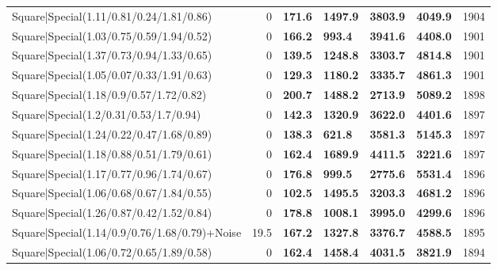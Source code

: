 \begin{tabular}{lrllllr}
 Square|Special(1.11/0.81/0.24/1.81/0.86)                      &             0   & \textbf{171.6} & \textbf{1497.9} & \textbf{3803.9} & \textbf{4049.9} &         1904 \\
 Square|Special(1.03/0.75/0.59/1.94/0.52)                      &             0   & \textbf{166.2} & \textbf{993.4}  & \textbf{3941.6} & \textbf{4408.0} &         1901 \\
 Square|Special(1.37/0.73/0.94/1.33/0.65)                      &             0   & \textbf{139.5} & \textbf{1248.8} & \textbf{3303.7} & \textbf{4814.8} &         1901 \\
 Square|Special(1.05/0.07/0.33/1.91/0.63)                      &             0   & \textbf{129.3} & \textbf{1180.2} & \textbf{3335.7} & \textbf{4861.3} &         1901 \\
 Square|Special(1.18/0.9/0.57/1.72/0.82)                       &             0   & \textbf{200.7} & \textbf{1488.2} & \textbf{2713.9} & \textbf{5089.2} &         1898 \\
 Square|Special(1.2/0.31/0.53/1.7/0.94)                        &             0   & \textbf{142.3} & \textbf{1320.9} & \textbf{3622.0} & \textbf{4401.6} &         1897 \\
 Square|Special(1.24/0.22/0.47/1.68/0.89)                      &             0   & \textbf{138.3} & \textbf{621.8}  & \textbf{3581.3} & \textbf{5145.3} &         1897 \\
 Square|Special(1.18/0.88/0.51/1.79/0.61)                      &             0   & \textbf{162.4} & \textbf{1689.9} & \textbf{4411.5} & \textbf{3221.6} &         1897 \\
 Square|Special(1.17/0.77/0.96/1.74/0.67)                      &             0   & \textbf{176.8} & \textbf{999.5}  & \textbf{2775.6} & \textbf{5531.4} &         1896 \\
 Square|Special(1.06/0.68/0.67/1.84/0.55)                      &             0   & \textbf{102.5} & \textbf{1495.5} & \textbf{3203.3} & \textbf{4681.2} &         1896 \\
 Square|Special(1.26/0.87/0.42/1.52/0.84)                      &             0   & \textbf{178.8} & \textbf{1008.1} & \textbf{3995.0} & \textbf{4299.6} &         1896 \\
 Square|Special(1.14/0.9/0.76/1.68/0.79)+Noise                 &            19.5 & \textbf{167.2} & \textbf{1327.8} & \textbf{3376.7} & \textbf{4588.5} &         1895 \\
 Square|Special(1.06/0.72/0.65/1.89/0.58)                      &             0   & \textbf{162.4} & \textbf{1458.4} & \textbf{4031.5} & \textbf{3821.9} &         1894 \\

\end{tabular}
